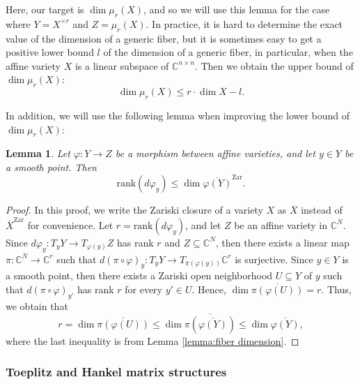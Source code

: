 \documentclass[reqno]{amsart}
\newtheorem{lemma}[theorem]{Lemma}
\theoremstyle{definition}
\newcommand{\rank}{\mathrm{rank}}
\numberwithin{equation}{section}
\begin{document}
Here, our target is $\dim \mu_r(X)$, and so we will use this lemma for the case where $Y=X^{\times r}$ and $Z=\mu_r(X)$. In practice, it is hard to determine the exact value of the dimension of a generic fiber, but it is sometimes easy to get a positive lower bound $l$ of the dimension of a generic fiber, in particular, when the affine variety $X$ is a linear subspace of $\mathbb{C}^{n \times n}$. Then we obtain the upper bound of $\dim \mu_r(X)$:
\begin{equation*}
        \dim \mu_r(X) \leq r \cdot \dim X- l.
\end{equation*}

In addition, we will use the following lemma when improving the lower bound of $\dim \mu_r(X)$:

\begin{lemma}\label{lemma:the rank of a differential gives a lower bound of dimension}
    Let $\varphi:Y \rightarrow Z$ be a morphism between affine varieties, and let $y \in Y$ be a smooth point. Then
    \begin{equation*}
        \rank (d\varphi_y) \leq \dim \overline{\varphi(Y)}^{\text{Zar}}.
    \end{equation*}
\end{lemma}
\begin{proof}
    In this proof, we write the Zariski closure of a variety $X$ as $\overline{X}$ instead of $\overline{X}^{\text{Zar}}$ for convenience. Let $r=\rank (d\varphi_y)$, and let $Z$ be an affine variety in $\mathbb{C}^N$. Since $d\varphi_y:T_yY \rightarrow T_{\varphi(y)}Z$ has rank $r$ and $Z \subseteq \mathbb{C}^{N}$, then there exists a linear map $\pi:\mathbb{C}^N \rightarrow \mathbb{C}^r$ such that $d(\pi \circ \varphi)_y:T_yY \rightarrow T_{\pi(\varphi(y))}\mathbb{C}^r$ is surjective. Since $y \in Y$ is a smooth point, then there exists a Zariski open neighborhood $U \subseteq Y$ of $y$ such that $d(\pi \circ \varphi)_{y'}$ has rank $r$ for every $y' \in U$. Hence, $\dim \overline{\pi(\varphi(U))}= r$. Thus, we obtain that
    \begin{equation*}
        r=\dim \overline{\pi(\varphi(U))} \leq  \dim \overline{\pi\left(\overline{\varphi(Y)}\right)} \leq \dim \overline{\varphi(Y)},
    \end{equation*}
    where the last inequality is from Lemma \ref{lemma:fiber dimension}.
\end{proof}

\subsubsection{Toeplitz and Hankel matrix structures}
\end{document}
